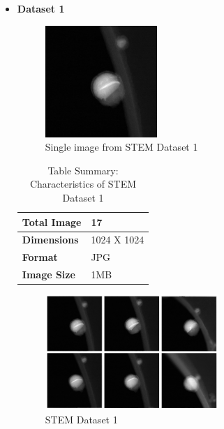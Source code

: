 \begin{itemize}
        \item \textbf{Dataset 1}
        
        \begin{figure}[H]
            \centering
            \includegraphics[width=0.4\textwidth]{img/Results/STEM dataset 1/Single_SD1.jpg}
            \caption{Single image from STEM Dataset 1}\label{fig:STEM Dataset 1}
        \end{figure}
        
        \begin{table}[H]
                  \centering
                  \caption{Table Summary: Characteristics of STEM Dataset 1}
                  \begin{tabularx}{.6\linewidth}{|X|X|}
                    \hline
                    \textbf{Total Image} & 17 \\
                    \hline
                    \textbf{Dimensions} & 1024 X 1024\\
                    \hline
                    \textbf{Format} & JPG \\
                    \hline
                    \textbf{Image Size} & 1MB \\
                    \hline
                  \end{tabularx}
              \end{table}
            
        \begin{figure}[H]
        \centering
        \includegraphics[width=0.62\textwidth]{img/STEM Dataset 1.png}
        \caption{STEM Dataset 1}\label{fig:STEM Dataset 1}
        \end{figure}


\end{itemize}
